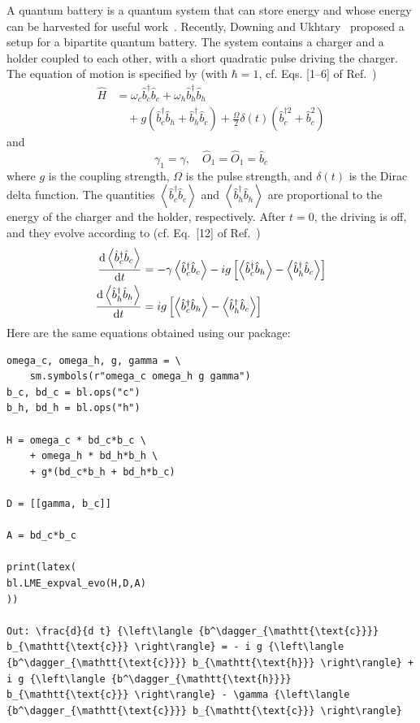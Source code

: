 \documentclass[5p, twocolumn, 10pt, sort&compress]{elsarticle}
\newcommand{\expval}[1]{\left\langle{#1}\right\rangle}
\newcommand{\bop}{\hat{b}}
\newcommand{\bdag}{\bop^\dagger}
\newcommand{\bdagn}[1]{\bop^{\dagger {#1}}}
\begin{document}
A quantum battery is a quantum system that can store energy and whose energy can be harvested for useful work~\cite{downing_hyperbolic_2024}. Recently, Downing and Ukhtary~\cite{downing_hyperbolic_2024} proposed a setup for a bipartite quantum battery. The system contains a charger and a holder coupled to each other, with a short quadratic pulse driving the charger. The equation of motion is specified by (with $\hbar=1$, cf. Eqs. [1--6] of Ref.~\cite{downing_hyperbolic_2024})
\begin{equation}
\begin{split}
    \hat{H} &= \omega_c \bdag_c\bop_c + \omega_h\bdag_h\bop_h \\
    &\quad + g\left(\bdag_c\bop_h+\bdag_h\bop_c\right) + \frac{\Omega}{2}\delta(t)\left(\bdagn{2}_c+\bop^2_c\right)
\end{split}
\end{equation}
and
\begin{equation}
    \gamma_1 = \gamma, \quad \hat{O}_1 =\hat{O}_1= \bop_c
\end{equation}
where $g$ is the coupling strength, $\Omega$ is the pulse strength, and $\delta(t)$ is the Dirac delta function. The quantities $\expval{\bdag_c\bop_c}$ and $\expval{\bdag_h\bop_h}$ are proportional to the energy of the charger and the holder, respectively. After $t=0$, the driving is off, and they evolve according to (cf. Eq.~[12] of Ref.~\cite{downing_hyperbolic_2024})
\begin{subequations}
\begin{align}
\odv{\expval{\bdag_c\bop_c}}{t} &= -\gamma \expval{\bdag_c\bop_c} - ig\left[\expval{\bdag_c\bop_h}-\expval{\bdag_h\bop_c}\right]  
\\
\odv{\expval{\bdag_h\bop_h}}{t} &= ig\left[\expval{\bdag_c\bop_h} - \expval{\bdag_h\bop_c}\right]
\end{align}
\end{subequations}
Here are the same equations obtained using our package:
\begin{verbatim}
omega_c, omega_h, g, gamma = \
    sm.symbols(r"omega_c omega_h g gamma")
b_c, bd_c = bl.ops("c")
b_h, bd_h = bl.ops("h")

H = omega_c * bd_c*b_c \
    + omega_h * bd_h*b_h \
    + g*(bd_c*b_h + bd_h*b_c)

D = [[gamma, b_c]]

A = bd_c*b_c

print(latex(
bl.LME_expval_evo(H,D,A)
))

Out: \frac{d}{d t} {\left\langle {b^\dagger_{\mathtt{\text{c}}}} b_{\mathtt{\text{c}}} \right\rangle} = - i g {\left\langle {b^\dagger_{\mathtt{\text{c}}}} b_{\mathtt{\text{h}}} \right\rangle} + i g {\left\langle {b^\dagger_{\mathtt{\text{h}}}} b_{\mathtt{\text{c}}} \right\rangle} - \gamma {\left\langle {b^\dagger_{\mathtt{\text{c}}}} b_{\mathtt{\text{c}}} \right\rangle}
\end{verbatim}
\end{document}
